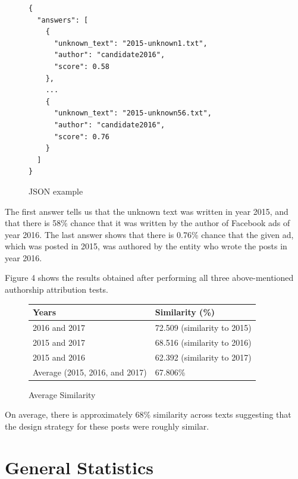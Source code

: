 \documentclass[12pt]{article}
\theoremstyle{definition}
\begin{document}
\begin{figure}[H]
\begin{verbatim}
{
  "answers": [
    {
      "unknown_text": "2015-unknown1.txt",
      "author": "candidate2016",
      "score": 0.58
    },
    ...
    {
      "unknown_text": "2015-unknown56.txt",
      "author": "candidate2016",
      "score": 0.76
    }
  ]
}
\end{verbatim}
\caption{JSON example}
\end{figure}

The first answer tells us that the unknown text was written in year 2015, and
that there is 58\% chance that it was written by the author of Facebook ads
of year 2016. The last answer shows that there is 0.76\% chance that the given
ad, which was posted in 2015, was authored by the entity who wrote the posts in
year 2016.

\bigskip

Figure 4 shows the results obtained after performing all three above-mentioned
authorship attribution tests.

\begin{figure}[H]
\centering
\begin{tabular}{|p{8cm}|p{8cm}|}
 \hline
 Years & Similarity (\%)\\
 \hline
 2016 and 2017 & 72.509 (similarity to 2015)\\
 \hline
 2015 and 2017 & 68.516 (similarity to 2016)\\
 \hline
 2015 and 2016 & 62.392 (similarity to 2017)\\
 \hline
 Average (2015, 2016, and 2017) & 67.806\%\\
 \hline
\end{tabular}
\caption{Average Similarity}
\end{figure}

On average, there is approximately 68\% similarity across texts suggesting that
the design strategy for these posts were roughly similar.


\section*{\centering General Statistics}
\end{document}
